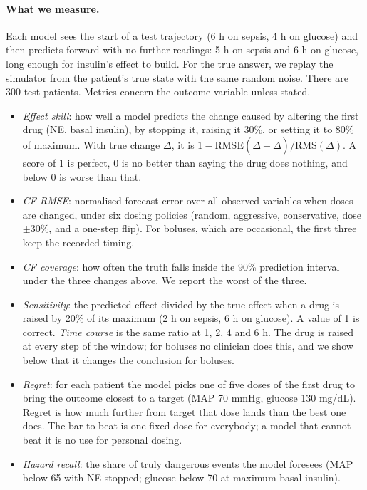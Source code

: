 \documentclass[letterpaper]{article}
\begin{document}
\paragraph{What we measure.} Each model sees the start of a test trajectory (6 h on sepsis, 4 h on glucose) and then predicts forward with no further readings: 5 h on sepsis and 6 h on glucose, long enough for insulin's effect to build. For the true answer, we replay the simulator from the patient's true state with the same random noise. There are 300 test patients. Metrics concern the outcome variable unless stated.
\begin{itemize}
\item \emph{Effect skill}: how well a model predicts the change caused by altering the first drug (NE, basal insulin), by stopping it, raising it 30\%, or setting it to 80\% of maximum. With true change $\Delta$, it is $1-\mathrm{RMSE}(\widehat{\Delta}-\Delta)/\mathrm{RMS}(\Delta)$. A score of 1 is perfect, 0 is no better than saying the drug does nothing, and below 0 is worse than that.
\item \emph{CF RMSE}: normalised forecast error over all observed variables when doses are changed, under six dosing policies (random, aggressive, conservative, dose $\pm$30\%, and a one-step flip). For boluses, which are occasional, the first three keep the recorded timing.
\item \emph{CF coverage}: how often the truth falls inside the 90\% prediction interval under the three changes above. We report the worst of the three.
\item \emph{Sensitivity}: the predicted effect divided by the true effect when a drug is raised by 20\% of its maximum (2 h on sepsis, 6 h on glucose). A value of 1 is correct. \emph{Time course} is the same ratio at 1, 2, 4 and 6 h. The drug is raised at every step of the window; for boluses no clinician does this, and we show below that it changes the conclusion for boluses.
\item \emph{Regret}: for each patient the model picks one of five doses of the first drug to bring the outcome closest to a target (MAP 70 mmHg, glucose 130 mg/dL). Regret is how much further from target that dose lands than the best one does. The bar to beat is one fixed dose for everybody; a model that cannot beat it is no use for personal dosing.
\item \emph{Hazard recall}: the share of truly dangerous events the model foresees (MAP below 65 with NE stopped; glucose below 70 at maximum basal insulin).
\end{itemize}
\end{document}
